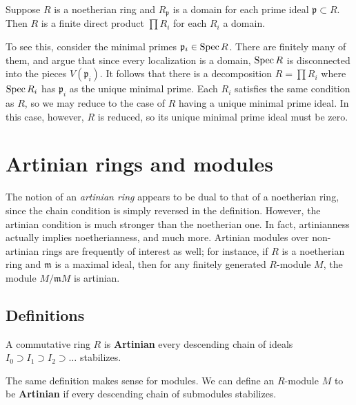 \begin{exercise} 
Suppose $R$ is a noetherian ring and $R_{\mathfrak{p}}$ is a domain for each prime ideal
$\mathfrak{p} \subset R$. Then $R$ is a finite direct product $\prod R_i$ for
each $R_i$ a domain.

To see this, consider the minimal primes $\mathfrak{p}_i \in \operatorname{Spec} R$. There
are finitely many of them, and argue that since every localization is a domain,
$\operatorname{Spec} R$ is disconnected into the pieces $V(\mathfrak{p}_i)$.
It follows that there is a decomposition $R = \prod R_{i}$ where $\operatorname{Spec} R_i$
has $\mathfrak{p}_i$ as the unique minimal prime. 
Each $R_i$ satisfies the same condition as $R$, so we may reduce to the case
of $R$ having a unique minimal prime ideal. In this case, however, $R$ is
reduced, so its unique minimal prime ideal must be zero.
\end{exercise} 



\section{Artinian rings and modules}

The notion of an \emph{artinian ring}  appears to be dual to that of a
noetherian ring, since the chain condition is simply reversed in the
definition. However, the artinian condition is much stronger than the
noetherian one. In fact, 
artinianness actually implies noetherianness, and much more. 
Artinian modules over non-artinian rings are frequently of interest as well;
for instance, if $R$ is a noetherian ring and $\mathfrak{m}$ is a maximal
ideal, then for any finitely generated $R$-module $M$, the module
$M/\mathfrak{m}M$ is artinian. 

\subsection{Definitions}

\begin{definition} 
A commutative ring $R$ is \textbf{Artinian} every descending chain of ideals
$I_0 \supset I_1 \supset I_2 \supset \dots$
stabilizes.
\end{definition} 

\begin{definition}
The same definition makes sense for modules. We can define an $R$-module $M$ to
be \textbf{Artinian} if every descending chain of submodules stabilizes. 
\end{definition}

